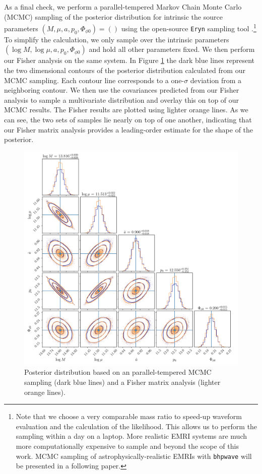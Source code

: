\documentclass[%
 reprint,
 nofootinbib,
 amsmath,amssymb,
 aps,
 prd,
]{revtex4-2}
\begin{document}
As a final check, we perform a parallel-tempered Markov Chain Monte Carlo (MCMC) sampling of the posterior distribution for intrinsic the source parameters $(M, \mu, a, p_0, \Phi_{\phi0}) = ()$ using the open-source \texttt{Eryn} sampling tool \cite{Eryn}.\footnote{Note that we choose a very comparable mass ratio to speed-up waveform evaluation and the calculation of the likelihood. This allows us to perform the sampling within a day on a laptop. More realistic EMRI systems are much more computationally expensive to sample and beyond the scope of this work. MCMC sampling of astrophysically-realistic EMRIs with \texttt{bhpwave} will be presented in a following paper.} To simplify the calculation, we only sample over the intrinsic parameters $(\log M, \log \mu, a, p_0, \Phi_{\phi0})$ and hold all other parameters fixed. We then perform our Fisher analysis on the same system. In Figure \ref{fig:mcmcOverlay} the dark blue lines represent the two dimensional contours of the posterior distribution calculated from our MCMC sampling. Each contour line corresponds to a one-$\sigma$ deviation from a neighboring contour. We then use the covariances predicted from our Fisher analysis to sample a multivariate distribution and overlay this on top of our MCMC results. The Fisher results are plotted using lighter orange lines. As we can see, the two sets of samples lie nearly on top of one another, indicating that our Fisher matrix analysis provides a leading-order estimate for the shape of the posterior. 

\begin{figure}[!htp]
    \centering
    \includegraphics[width=0.98\linewidth]{figures/mcmc.pdf}
    \caption{Posterior distribution based on an parallel-tempered MCMC sampling (dark blue lines) and a Fisher matrix analysis (lighter orange lines).}
    \label{fig:mcmcOverlay}
\end{figure}



\end{document}
